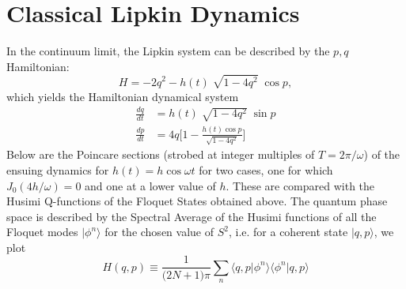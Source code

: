 \documentclass{article}
\begin{document}
\section{ Classical Lipkin Dynamics}

In the continuum limit, the Lipkin system can be described by the $p,q$ Hamiltonian:
\begin{equation*}
H = -2 q^2 - h(t)\;\sqrt{1-4q^2}\;\cos{p},
\end{equation*}
which yields the Hamiltonian dynamical system 
\begin{align*}
\frac{dq}{dt} &= h(t)\;\sqrt{1-4q^2}\;\sin{p}\\
\frac{dp}{dt} &= 4q\bigg[1-\frac{h(t)\cos{p}}{\sqrt{1-4q^2}}\bigg]
\end{align*}
Below are the Poincare sections (strobed at integer multiples of $T=2\pi/\omega$) of the ensuing dynamics for $h(t)=h\cos{\omega t}$ for two cases, one for which $J_0(4h/\omega)=0$ and one at a lower value of $h$. These are compared with the Husimi Q-functions of the Floquet States obtained above. The quantum phase space is described by the Spectral Average of the Husimi functions of all the Floquet modes $|\phi^n\rangle$ for the chosen value of $S^2$, i.e. for a coherent state $|q, p\rangle$, we plot
\begin{equation*}
H(q,p)\equiv \frac{1}{\big(2N+1\big)\pi}\sum_n \langle q,p\vert \phi^n\rangle\langle\phi^n\vert q,p\rangle
\end{equation*}
\end{document}
